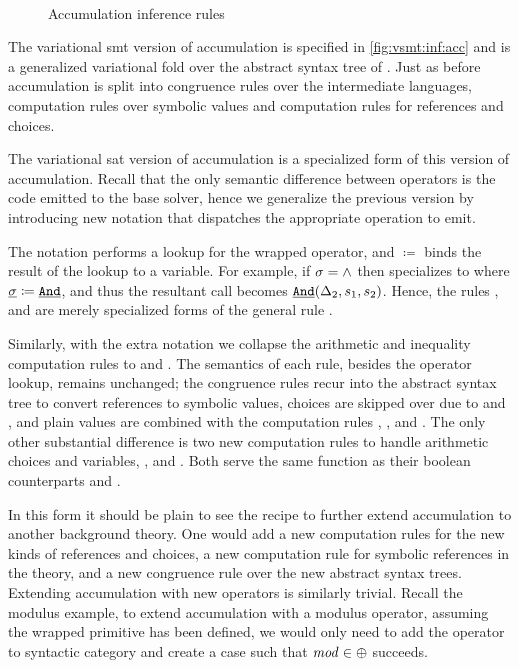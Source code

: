~\label{section:vsmt:accumulation}
%
\begin{figure}
  
  \caption{Accumulation inference rules}%
  \label{fig:vsmt:inf:acc}
\end{figure}
%
%
The variational \ac{smt} version of accumulation is specified in
\autoref{fig:vsmt:inf:acc} and is a generalized variational fold over the
abstract syntax tree of \eIL. Just as before accumulation is split into
congruence rules over the intermediate languages, computation rules over
symbolic values and computation rules for references and choices.

The variational \ac{sat} version of accumulation is a specialized form of this
version of accumulation. Recall that the only semantic difference between
operators is the code emitted to the base solver, hence we generalize the
previous version by introducing new notation that dispatches the appropriate
operation to emit.

The notation \lookup{\op}{\boolFuncs} performs a lookup for the wrapped
operator, and $\coloneqq$ binds the result of the lookup to a variable. For
example, if $\sigma = \wedge$ then \acBoolS{} specializes to \acAndS{} where
$\underline{\sigma} \coloneqq \underline{\texttt{And}}$, and thus the resultant call becomes
$\underline{\texttt{And}}(\Delta_{2}, s_1, s_2)$. Hence, the rules \acAndS{}, and \acOrS{}
are merely specialized forms of the general rule \acBoolS.

Similarly, with the extra notation we collapse the arithmetic and inequality
computation rules to \acArithS{} and \acInEqS{}. The semantics of each rule,
besides the operator lookup, remains unchanged; the congruence rules recur into
the abstract syntax tree to convert references to symbolic values, choices are
skipped over due to \acChc{} and \acChcI{}, and plain values are combined with
the computation rules \acBoolS, \acArithS, and \acInEqS.
%
The only other substantial difference is two new computation rules to handle
arithmetic choices and variables, \acChcI{}, and \acRefI{}. Both serve the same
function as their boolean counterparts \acChc{} and \acRef{}. 

In this form it should be plain to see the recipe to further extend accumulation
to another background theory. One would add a new computation rules for the new
kinds of references and choices, a new computation rule for symbolic references
in the theory, and a new congruence rule over the new abstract syntax trees.
Extending accumulation with new operators is similarly trivial. Recall the
modulus example, to extend accumulation with a modulus operator, assuming the
wrapped primitive has been defined, we would only need to add the operator to
\integerFuncs{} syntactic category and create a case such that $\mathit{mod} \in
\oplus{}{}$ succeeds.




